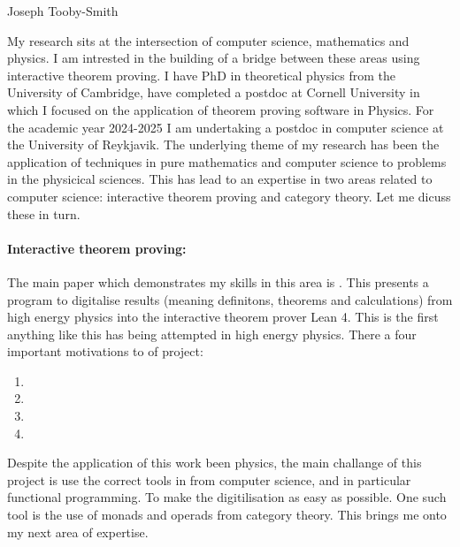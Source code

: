 \documentclass[14pt,letter]{article}
\newcounter{customtitle}
\begin{document}
\vspace{-1cm}
\begin{flushright}
{{\Large \color{white}Joseph Tooby-Smith }}
\end{flushright}
\vspace{0.4cm}

My research sits at the intersection of computer science, 
mathematics and physics.
I am intrested in the building of a bridge between these areas using 
interactive theorem proving. I have PhD in theoretical physics 
from the University of Cambridge, 
have completed a postdoc at Cornell University in which I focused on the 
application of theorem proving software in Physics. For the academic 
year 2024-2025 I am undertaking a postdoc in computer science at the 
University of Reykjavik.
The underlying theme of my research has been 
the application of techniques in pure mathematics and computer science 
to problems in the physicical sciences. This has lead to an 
expertise in two areas related to computer science: 
interactive theorem proving and category theory.
Let me dicuss these in turn.

\paragraph{Interactive theorem proving:} The main paper which demonstrates my skills in this area 
is . This presents a program to digitalise results 
(meaning definitons, theorems and calculations)
from high energy physics into 
the interactive theorem prover Lean 4. 
This is the first anything like this has being attempted
in high energy physics. There a four important motivations to of project: 
\begin{enumerate}
\item 
\item 
\item 
\item 
\end{enumerate}

Despite the application of this work been physics, the main challange of this project is 
use the correct tools in from computer science, and in particular functional programming.
To make the digitilisation as easy as possible. One such tool is the use of monads and operads
from category theory. This brings me onto my next area of expertise.
\end{document}
